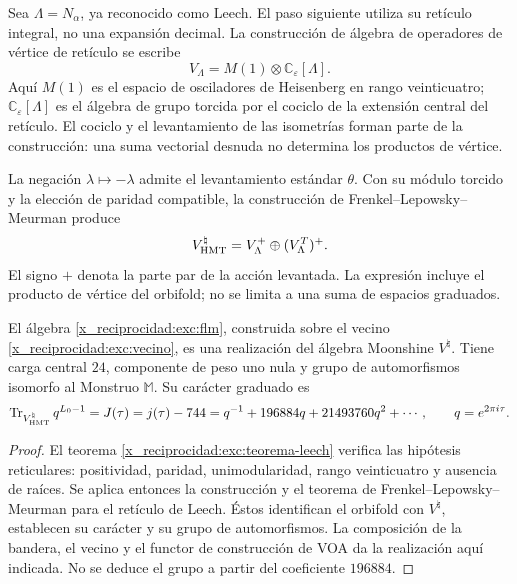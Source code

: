Sea $\Lambda=N_\alpha$, ya reconocido como Leech. El paso siguiente
utiliza su retículo integral, no una expansión decimal. La construcción
de álgebra de operadores de vértice de retículo se escribe
\[
 V_\Lambda=M(1)\otimes\mathbb C_\varepsilon[\Lambda].
\]
Aquí $M(1)$ es el espacio de osciladores de Heisenberg en rango
veinticuatro; $\mathbb C_\varepsilon[\Lambda]$ es el álgebra de grupo
torcida por el cociclo de la extensión central del retículo. El
cociclo y el levantamiento de las isometrías forman parte de la
construcción: una suma vectorial desnuda no determina los productos
de vértice.

La negación $\lambda\mapsto-\lambda$ admite el levantamiento estándar
$\theta$. Con su módulo torcido y la elección de paridad compatible,
la construcción de Frenkel--Lepowsky--Meurman produce
\begin{equation}
 V^\natural_{\rm HMT}
   =V_\Lambda^+\oplus(V_\Lambda^T)^+.
 \label{x_reciprocidad:exc:flm}
\end{equation}
El signo $+$ denota la parte par de la acción levantada. La expresión
incluye el producto de vértice del orbifold; no se limita a una suma
de espacios graduados.

\begin{theorem}
\label{x_reciprocidad:exc:moonshine}
El álgebra \eqref{x_reciprocidad:exc:flm}, construida sobre el vecino
\eqref{x_reciprocidad:exc:vecino}, es una realización del álgebra Moonshine
$V^\natural$. Tiene carga central $24$, componente de peso uno nula
y grupo de automorfismos isomorfo al Monstruo $\mathbb M$. Su carácter
graduado es
\begin{equation}
 \operatorname{Tr}_{V^\natural_{\rm HMT}}q^{L_0-1}
   =J(\tau)=j(\tau)-744
   =q^{-1}+196884q+21493760q^2+\cdots,
 \qquad q=e^{2\pi i\tau}.
 \label{x_reciprocidad:exc:j}
\end{equation}
\end{theorem}

\begin{proof}
El teorema \ref{x_reciprocidad:exc:teorema-leech} verifica las hipótesis reticulares:
positividad, paridad, unimodularidad, rango veinticuatro y ausencia de
raíces. Se aplica entonces la construcción y el teorema de
Frenkel--Lepowsky--Meurman para el retículo de Leech. Éstos identifican
el orbifold con $V^\natural$, establecen su carácter y su grupo de
automorfismos. La composición de la bandera, el vecino y el functor
de construcción de VOA da la realización aquí indicada. No se deduce
el grupo a partir del coeficiente $196884$.
\end{proof}

